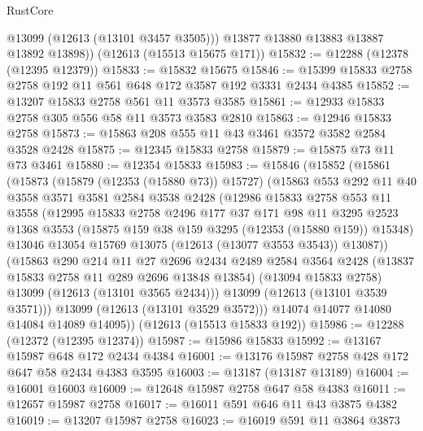 \begin{lexlean}{RustCore}
\begin{coremodule}
          @13099
          (@12613 (@13101 @3457 @3505)))
        @13877
        @13880
        @13883
        @13887
        @13892
        @13898))
    (@12613 (@15513 @15675 @171))
@15832 := @12288 (@12378 (@12395 @12379))
@15833 := @15832 @15675
@15846 := @15399 @15833 @2758 @2758 @192 @11 @561 @648 @172 @3587 @192 @3331 @2434 @4385
@15852 := @13207 @15833 @2758 @561 @11 @3573 @3585
@15861 := @12933 @15833 @2758 @305 @556 @58 @11 @3573 @3583 @2810
@15863 := @12946 @15833 @2758
@15873 := @15863 @208 @555 @11 @43 @3461 @3572 @3582 @2584 @3528 @2428
@15875 := @12345 @15833 @2758
@15879 := @15875 @73 @11 @73 @3461
@15880 := @12354 @15833
@15983 := @15846
    (@15852
      (@15861
        (@15873
          (@15879 (@12353 (@15880 @73)) @15727)
          (@15863
            @553
            @292
            @11
            @40
            @3558
            @3571
            @3581
            @2584
            @3538
            @2428
            (@12986
              @15833
              @2758
              @553
              @11
              @3558
              (@12995
                @15833
                @2758
                @2496
                @177
                @37
                @171
                @98
                @11
                @3295
                @2523
                @1368
                @3553
                (@15875 @159 @38 @159 @3295 (@12353 (@15880 @159)) @15348)
                @13046
                @13054
                @15769
                @13075
                (@12613 (@13077 @3553 @3543))
                @13087))
            (@15863
              @290
              @214
              @11
              @27
              @2696
              @2434
              @2489
              @2584
              @3564
              @2428
              (@13837 @15833 @2758 @11 @289 @2696 @13848 @13854)
              (@13094 @15833 @2758)
              @13099
              (@12613 (@13101 @3565 @2434)))
            @13099
            (@12613 (@13101 @3539 @3571)))
          @13099
          (@12613 (@13101 @3529 @3572)))
        @14074
        @14077
        @14080
        @14084
        @14089
        @14095))
    (@12613 (@15513 @15833 @192))
@15986 := @12288 (@12372 (@12395 @12374))
@15987 := @15986 @15833
@15992 := @13167 @15987 @648 @172 @2434 @4384
@16001 := @13176 @15987 @2758 @428 @172 @647 @58 @2434 @4383 @3595
@16003 := @13187 (@13187 @13189)
@16004 := @16001 @16003
@16009 := @12648 @15987 @2758 @647 @58 @4383
@16011 := @12657 @15987 @2758
@16017 := @16011 @591 @646 @11 @43 @3875 @4382
@16019 := @13207 @15987 @2758
@16023 := @16019 @591 @11 @3864 @3873

\end{coremodule}
\end{lexlean}
